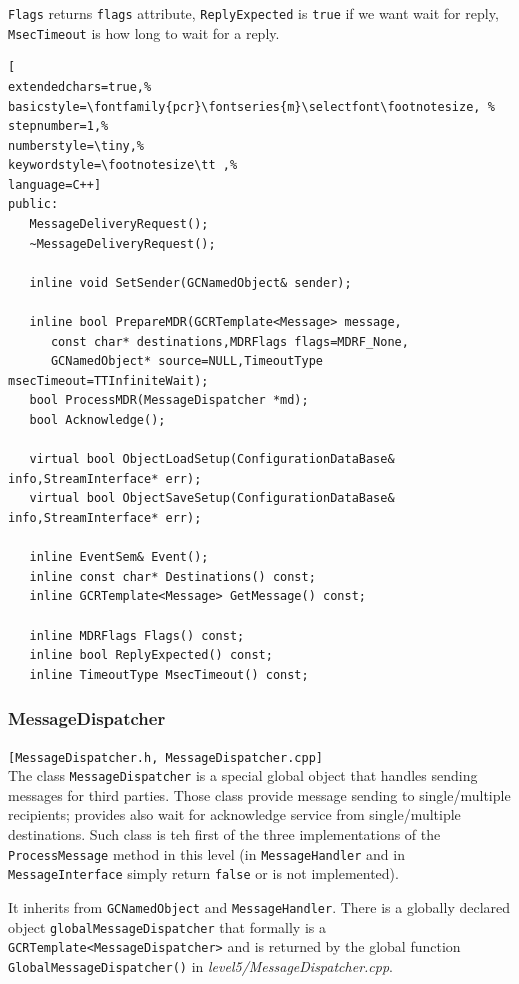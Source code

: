 \texttt{Flags} returns \texttt{flags} attribute, \texttt{ReplyExpected} is \texttt{true} if we want wait for reply, \texttt{MsecTimeout} is how long to wait for a reply.
\begin{lstlisting}[
extendedchars=true,%
basicstyle=\fontfamily{pcr}\fontseries{m}\selectfont\footnotesize, %
stepnumber=1,%
numberstyle=\tiny,%
keywordstyle=\footnotesize\tt ,%
language=C++]
public:
   MessageDeliveryRequest();
   ~MessageDeliveryRequest();

   inline void SetSender(GCNamedObject& sender);

   inline bool PrepareMDR(GCRTemplate<Message> message,
      const char* destinations,MDRFlags flags=MDRF_None,
      GCNamedObject* source=NULL,TimeoutType msecTimeout=TTInfiniteWait);
   bool ProcessMDR(MessageDispatcher *md);
   bool Acknowledge();

   virtual bool ObjectLoadSetup(ConfigurationDataBase& info,StreamInterface* err);
   virtual bool ObjectSaveSetup(ConfigurationDataBase& info,StreamInterface* err);
   
   inline EventSem& Event();
   inline const char* Destinations() const;
   inline GCRTemplate<Message> GetMessage() const;

   inline MDRFlags Flags() const;
   inline bool ReplyExpected() const;
   inline TimeoutType MsecTimeout() const;
\end{lstlisting}



\subsubsection{MessageDispatcher}
\texttt{[MessageDispatcher.h, MessageDispatcher.cpp]}\\
The class \texttt{MessageDispatcher} is a special global object that handles sending messages for third parties. Those class provide message sending to single/multiple recipients; provides also wait for acknowledge service from single/multiple destinations. Such class is teh first of the three implementations of the \texttt{ProcessMessage} method in this level (in \texttt{MessageHandler} and in \texttt{MessageInterface} simply return \texttt{false} or is not implemented).

It inherits from \texttt{GCNamedObject} and \texttt{MessageHandler}. There is a globally declared object \texttt{globalMessageDispatcher} that formally is a \texttt{GCRTemplate<MessageDispatcher>} and is returned by the global function \texttt{GlobalMessageDispatcher()} in \textit{level5/MessageDispatcher.cpp}. \\


